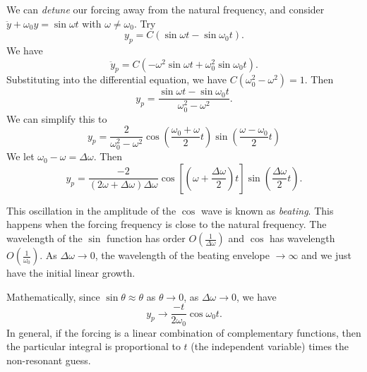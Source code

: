 \documentclass[a4paper]{article}
\begin{document}
We can \emph{detune} our forcing away from the natural frequency, and consider $\ddot y + \omega_0 y = \sin \omega t$ with $\omega \not= \omega_0$. Try
\[
  y_p = C(\sin \omega t - \sin \omega_0 t).
\]
We have
\[
  \ddot y_p = C(-\omega^2 \sin \omega t + \omega_0^2 \sin\omega_0 t).
\]
Substituting into the differential equation, we have $C(\omega_0^2 - \omega^2) = 1$. Then
\[
  y_p = \frac{\sin \omega t - \sin \omega_0t}{\omega_0^2 - \omega^2}.
\]
We can simplify this to
\[
  y_p = \frac{2}{\omega_0^2 - \omega^2} \cos \left(\frac{\omega_0 + \omega}{2}t\right) \sin \left(\frac{\omega - \omega_0}{2} t\right)
\]
We let $\omega_0 - \omega = \Delta \omega$. Then
\[
  y_p = \frac{-2}{(2\omega + \Delta \omega)\Delta \omega}\cos \left[\left(\omega + \frac{\Delta \omega}{2}\right)t\right] \sin \left(\frac{\Delta \omega}{2}t\right).
\]
\begin{center}
\end{center}
This oscillation in the amplitude of the $\cos$ wave is known as \emph{beating}. This happens when the forcing frequency is close to the natural frequency. The wavelength of the $\sin$ function has order $O(\frac{1}{\Delta \omega})$ and $\cos$ has wavelength $O(\frac{1}{\omega_0})$. As $\Delta\omega\to 0$, the wavelength of the beating envelope $\to \infty$ and we just have the initial linear growth.

Mathematically, since $\sin\theta \approx \theta$ as $\theta \to 0$, as $\Delta\omega \to 0$, we have
\[
  y_p\to \frac{-t}{2\omega_0}\cos\omega_0 t.
\]
In general, if the forcing is a linear combination of complementary functions, then the particular integral is proportional to $t$ (the independent variable) times the non-resonant guess.
\end{document}
